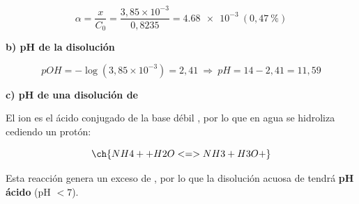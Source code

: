 \begin{exerciseEVAU}
\begin{solu}
    \begin{equation*}
        \alpha = \dfrac{x}{C_0} = \dfrac{3,85 \times 10^{-3}}{0,8235} = \num{4.68e-3} \ (0,47\ \%)
    \end{equation*}

    \textbf{b) pH de la disolución}

    \begin{equation*}
        pOH = -\log(3,85 \times 10^{-3}) = 2,41 \  \Rightarrow \  pH = 14 - 2,41 = 11,59
    \end{equation*}

    \textbf{c) pH de una disolución de }

    El ion  es el ácido conjugado de la base débil , por lo que en agua se hidroliza cediendo un protón:

    \begin{equation*}
        \ch{NH4+ + H2O <=> NH3 + H3O+}
    \end{equation*}

    Esta reacción genera un exceso de , por lo que la disolución acuosa de  tendrá \textbf{pH ácido} (pH \(<7\)).

\end{solu}
\end{exerciseEVAU}

